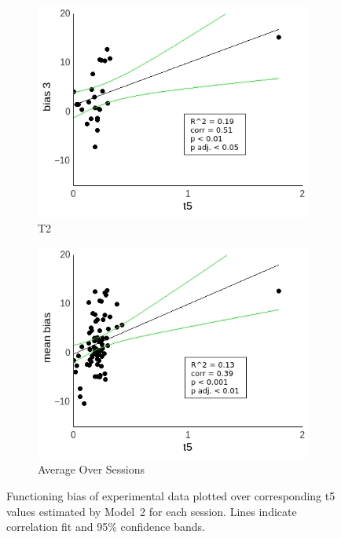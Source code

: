 \documentclass[a4paper]{scrreprt}
\begin{document}
\begin{figure}
\begin{subfigure}[b]{0.49\textwidth}
        \includegraphics[width=\textwidth]{figs/sec3/t5/t5_diff_3_mod2dat.jpeg}
        \caption{T2}
    \end{subfigure}
    \begin{subfigure}[b]{0.49\textwidth}
        \includegraphics[width=\textwidth]{figs/sec3/t5/t5_diff_mean_mod2dat.jpeg}
        \caption{Average Over Sessions}
    \end{subfigure}
\caption{Functioning bias of experimental data plotted over corresponding t5 values estimated by Model~2 for each session. Lines indicate correlation fit and 95\% confidence bands.}
\label{fig:t5_diff_mod2dat}
\end{figure}
\end{document}
